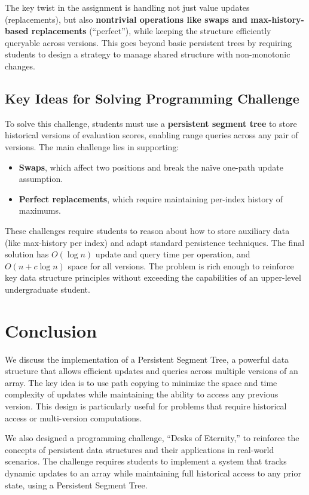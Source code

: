 \documentclass{fairmeta}
\numberwithin{equation}{section}
\begin{document}
The key twist in the assignment is handling not just value updates (replacements), but also \textbf{nontrivial operations like swaps and max-history-based replacements} (``perfect''), while keeping the structure efficiently queryable across versions. This goes beyond basic persistent trees by requiring students to design a strategy to manage shared structure with non-monotonic changes.

\subsection*{Key Ideas for Solving Programming Challenge}

To solve this challenge, students must use a \textbf{persistent segment tree} to store historical versions of evaluation scores, enabling range queries across any pair of versions. The main challenge lies in supporting:
\begin{itemize}
    \item \textbf{Swaps}, which affect two positions and break the naïve one-path update assumption.
    \item \textbf{Perfect replacements}, which require maintaining per-index history of maximums.
\end{itemize}

These challenges require students to reason about how to store auxiliary data (like max-history per index) and adapt standard persistence techniques. The final solution has $O(\log n)$ update and query time per operation, and $O(n + c \log n)$ space for all versions. The problem is rich enough to reinforce key data structure principles without exceeding the capabilities of an upper-level undergraduate student.

\section{Conclusion}

We discuss the implementation of a Persistent Segment Tree, a powerful data structure that allows efficient updates and queries across multiple versions of an array. The key idea is to use path copying to minimize the space and time complexity of updates while maintaining the ability to access any previous version. This design is particularly useful for problems that require historical access or multi-version computations.

We also designed a programming challenge, ``Desks of Eternity,'' to reinforce the concepts of persistent data structures and their applications in real-world scenarios. The challenge requires students to implement a system that tracks dynamic updates to an array while maintaining full historical access to any prior state, using a Persistent Segment Tree.
\end{document}
